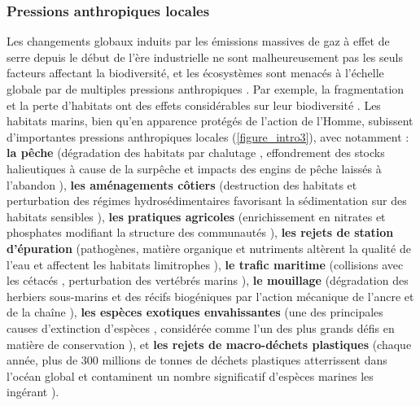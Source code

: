 \subsubsection{Pressions anthropiques locales}\label{intro.1.2.2}
Les changements globaux induits par les émissions massives de gaz à effet de serre depuis le début de l’ère industrielle ne sont malheureusement pas les seuls facteurs affectant la biodiversité, et les écosystèmes sont menacés à l’échelle globale par de multiples pressions anthropiques \citep{hoekstra_confronting_2004, halpern_global_2008}. Par exemple, la fragmentation et la perte d’habitats ont des effets considérables sur leur biodiversité \citep{brooks_habitat_2002, haddad_habitat_2015}. Les habitats marins, bien qu’en apparence protégés de l’action de l’Homme, subissent d’importantes pressions anthropiques locales \citep{micheli_cumulative_2013, halpern_spatial_2015, holon_predictive_2018} (\autoref{figure_intro3}), avec notamment : \textbf{la pêche} (dégradation des habitats par chalutage \citep{hiddink_global_2017}, effondrement des stocks halieutiques à cause de la surpêche \citep{christensen_century_2014, essington_fishing_2015, link_global_2019} et impacts des engins de pêche laissés à l’abandon \citep{wilcox_understanding_2015, moschino_is_2019}), \textbf{les aménagements côtiers} (destruction des habitats et perturbation des régimes hydrosédimentaires favorisant la sédimentation sur des habitats sensibles \citep{airoldi_effects_2003, holon_predictive_2018}), \textbf{les pratiques agricoles} (enrichissement en nitrates et phosphates modifiant la structure des communautés \citep{berger_effects_2003, savage_effects_2010}), \textbf{les rejets de station d’épuration} (pathogènes, matière organique et nutriments altèrent la qualité de l’eau et affectent les habitats limitrophes \citep{orth_global_2006, waycott_accelerating_2009}), \textbf{le trafic maritime} (collisions avec les cétacés \citep{peltier_monitoring_2019}, perturbation des vertébrés marins \citep{bruintjes_rapid_2016, simpson_anthropogenic_2016, bas_marine_2017,slabbekoorn_effects_2018}), \textbf{le mouillage} (dégradation des herbiers sous-marins \citep{short_natural_1996} et des récifs biogéniques \citep{ballesteros_mediterranean_2006} par l’action mécanique de l’ancre et de la chaîne \citep{milazzo_boat_2004}), \textbf{les espèces exotiques envahissantes} (une des principales causes d’extinction d’espèces \citep{bellard_alien_2016}, considérée comme l’un des plus grands défis en matière de conservation \citep{pysek_invasive_2010}), et \textbf{les rejets de macro-déchets plastiques} (chaque année, plus de 300 millions de tonnes de déchets plastiques atterrissent dans l’océan global \citep{law_plastics_2017} et contaminent un nombre significatif d’espèces marines les ingérant \citep{schuyler_global_2013, wilcox_threat_2015}).

